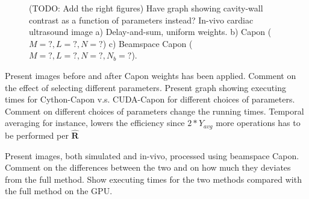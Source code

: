 \documentclass[journal]{IEEEtran}
\newcommand{\mat}[1]{\mathbf{#1}}
\begin{document}
\begin{figure}[!t]
\centerline{
\hfil
{}
\hfil
{}}
\caption{(TODO: Add the right figures) Have graph showing cavity-wall contrast as a function of parameters instead? In-vivo cardiac ultrasound image a) Delay-and-sum, uniform weights. b) Capon ($M=?, L=?, N=?$) c) Beamspace Capon ($M=?, L=?, N=?, N_b=?$).}
\label{fig:bench}
\end{figure}

Present images before and after Capon weights has been applied. Comment on the effect of selecting different parameters. Present graph showing executing times for Cython-Capon v.s. CUDA-Capon for different choices of parameters. Comment on different choices of parameters change the running times. Temporal averaging for instance, lowers the efficiency since $2*Y_{avg}$ more operations has to be performed per $\mat{\hat{R}}$    

Present images, both simulated and in-vivo, processed using beamspace Capon. Comment on the differences between the two and on how much they deviates from the full method.
Show executing times for the two methods compared with the full method on the GPU.
\end{document}

